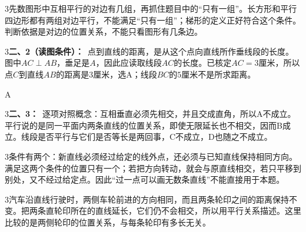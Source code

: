 \documentclass[multi=snippet,border={5bp 20bp 5bp 5bp}]{standalone}
\newenvironment{snippet}[3]{\begin{minipage}{#1bp}\color{answerred}\fontsize{#2}{#3}\selectfont\raggedright}{\end{minipage}}
\begin{document}
\begin{snippet}{505}{11.5}{14}\begin{multicols}{3}\raggedcolumns 先数图形中互相平行的对边有几组，再抓住题目中的“只有一组”。长方形和平行四边形都有两组对边平行，不能满足“只有一组”；梯形的定义正好符合这个条件。判断依据是对边的位置关系，不能只看图形有几条边。\end{multicols}\end{snippet}
\begin{snippet}{505}{11.5}{14}\begin{multicols}{3}\raggedcolumns \textbf{二、2（读图条件）：}\ 点到直线的距离，是从这个点向直线所作垂线段的长度。图中\(AC\perp AB\)\allowbreak ，垂足是\(A\)\allowbreak ，因此应读取线段\(AC\)\allowbreak 的长度。已核定\(AC=3\)\allowbreak 厘米，所以点\(C\)\allowbreak 到直线\(AB\)\allowbreak 的距离是\(3\)\allowbreak 厘米，选\(\mathrm A\)\allowbreak ；线段\(BC\)\allowbreak 的\(5\)\allowbreak 厘米不是所求距离。\end{multicols}\end{snippet}
\begin{snippet}{7.699999999999989}{11.5}{14}\SourceSans{}\end{snippet}
\begin{snippet}{18}{11.5}{14}\SourceSans\setlength{\mathindent}{2bp}\(\mathrm A\)\end{snippet}
\begin{snippet}{505}{11.5}{14}\begin{multicols}{3}\raggedcolumns \textbf{二、3：}\ 逐项对照概念：互相垂直必须先相交，并且交成直角，所以A不成立。平行说的是同一平面内两条直线的位置关系，即使无限延长也不相交，因而B成立。线段是否平行与它们是否等长是两回事，C不成立，D也随之不成立。\end{multicols}\end{snippet}
\begin{snippet}{505}{11.5}{14}\begin{multicols}{3}\raggedcolumns 条件有两个：新直线必须经过给定的线外点，还必须与已知直线保持相同方向。满足这两个条件的位置只有一个；若把方向转动，就会与原直线相交，若只平移到别处，又不经过给定点。因此“过一点可以画无数条直线”不能直接用于本题。\end{multicols}\end{snippet}
\begin{snippet}{505}{11.5}{14}\begin{multicols}{3}\raggedcolumns 汽车沿直线行驶时，两侧车轮前进的方向相同，而且两条轮印之间的距离保持不变。把两条直轮印所在的直线延长，它们仍不会相交，所以用平行关系描述。这里比较的是两侧轮印的位置关系，与每条轮印有多长无关。\end{multicols}\end{snippet}
\end{document}
